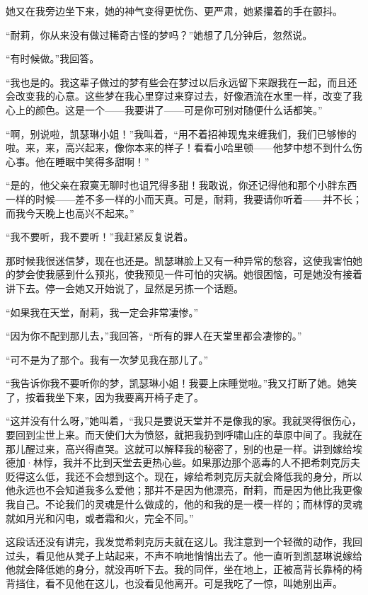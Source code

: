 \par 她又在我旁边坐下来，她的神气变得更忧伤、更严肃，她紧攥着的手在颤抖。
\par “耐莉，你从来没有做过稀奇古怪的梦吗？”她想了几分钟后，忽然说。
\par “有时候做。”我回答。
\par “我也是的。我这辈子做过的梦有些会在梦过以后永远留下来跟我在一起，而且还会改变我的心意。这些梦在我心里穿过来穿过去，好像酒流在水里一样，改变了我心上的颜色。这是一个——我要讲了——可是你可别对随便什么话都笑。”
\par “啊，别说啦，凯瑟琳小姐！”我叫着，“用不着招神现鬼来缠我们，我们已够惨的啦。来，来，高兴起来，像你本来的样子！看看小哈里顿——他梦中想不到什么伤心事。他在睡眠中笑得多甜啊！”
\par “是的，他父亲在寂寞无聊时也诅咒得多甜！我敢说，你还记得他和那个小胖东西一样的时候——差不多一样的小而天真。可是，耐莉，我要请你听着——并不长；而我今天晚上也高兴不起来。”
\par “我不要听，我不要听！”我赶紧反复说着。
\par 那时候我很迷信梦，现在也还是。凯瑟琳脸上又有一种异常的愁容，这使我害怕她的梦会使我感到什么预兆，使我预见一件可怕的灾祸。她很困恼，可是她没有接着讲下去。停一会她又开始说了，显然是另拣一个话题。
\par “如果我在天堂，耐莉，我一定会非常凄惨。”
\par “因为你不配到那儿去，”我回答，“所有的罪人在天堂里都会凄惨的。”
\par “可不是为了那个。我有一次梦见我在那儿了。”
\par “我告诉你我不要听你的梦，凯瑟琳小姐！我要上床睡觉啦。”我又打断了她。她笑了，按着我坐下来，因为我要离开椅子走了。
\par “这并没有什么呀，”她叫着，“我只是要说天堂并不是像我的家。我就哭得很伤心，要回到尘世上来。而天使们大为愤怒，就把我扔到呼啸山庄的草原中间了。我就在那儿醒过来，高兴得直哭。这就可以解释我的秘密了，别的也是一样。讲到嫁给埃德加·林惇，我并不比到天堂去更热心些。如果那边那个恶毒的人不把希刺克厉夫贬得这么低，我还不会想到这个。现在，嫁给希刺克厉夫就会降低我的身分，所以他永远也不会知道我多么爱他；那并不是因为他漂亮，耐莉，而是因为他比我更像我自己。不论我们的灵魂是什么做成的，他的和我的是一模一样的；而林惇的灵魂就如月光和闪电，或者霜和火，完全不同。”
\par 这段话还没有讲完，我发觉希刺克厉夫就在这儿。我注意到一个轻微的动作，我回过头，看见他从凳子上站起来，不声不响地悄悄出去了。他一直听到凯瑟琳说嫁给他就会降低她的身分，就没再听下去。我的同伴，坐在地上，正被高背长靠椅的椅背挡住，看不见他在这儿，也没看见他离开。可是我吃了一惊，叫她别出声。
